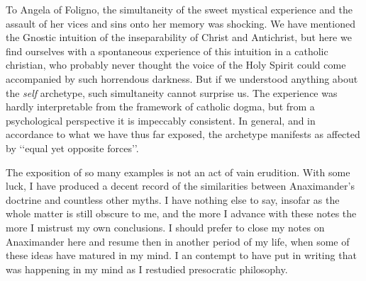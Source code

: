 \documentclass[a4paper]{article}
\begin{document}
To Angela of Foligno, the simultaneity of the sweet mystical experience and the
assault of her vices and sins onto her memory was shocking. We have mentioned the
Gnostic intuition of the inseparability of Christ and Antichrist, but here we
find ourselves with a spontaneous experience of this intuition in a catholic
christian, who probably never thought the voice of the Holy Spirit could come
accompanied by such horrendous darkness. But if we understood anything about the
\textit{self} archetype, such simultaneity cannot surprise us. The experience
was hardly interpretable from the framework of catholic dogma, but from a
psychological perspective it is impeccably consistent. In general, and in
accordance to what we have thus far exposed, the archetype manifests as affected
by \lq\lq equal yet opposite forces\rq\rq.

The exposition of so many examples is not an act of vain erudition. With some
luck, I have produced a decent record of the similarities between Anaximander's
doctrine and countless other myths. I have nothing else to say, insofar as the
whole matter is still obscure to me, and the more I advance with these notes the
more I mistrust my own conclusions. I should prefer to close my notes on
Anaximander here and resume then in another period of my life, when some of
these ideas have matured in my mind. I an contempt to have put in writing that
was happening in my mind as I restudied presocratic philosophy. 
\end{document}
